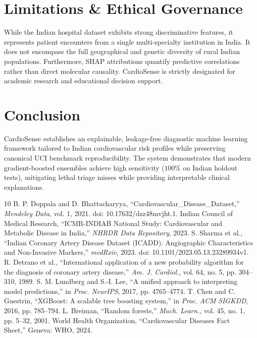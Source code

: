 \documentclass[journal]{IEEEtran}
\begin{document}
\section{Limitations \& Ethical Governance}
While the Indian hospital dataset exhibits strong discriminative features, it represents patient encounters from a single multi-specialty institution in India. It does not encompass the full geographical and genetic diversity of rural Indian populations. Furthermore, SHAP attributions quantify predictive correlations rather than direct molecular causality. CardioSense is strictly designated for academic research and educational decision support.

\section{Conclusion}
CardioSense establishes an explainable, leakage-free diagnostic machine learning framework tailored to Indian cardiovascular risk profiles while preserving canonical UCI benchmark reproducibility. The system demonstrates that modern gradient-boosted ensembles achieve high sensitivity ($100\%$ on Indian holdout tests), mitigating lethal triage misses while providing interpretable clinical explanations.

\begin{thebibliography}{10}
 B. P. Doppala and D. Bhattacharyya, ``Cardiovascular\_Disease\_Dataset,'' \emph{Mendeley Data}, vol. 1, 2021. doi: 10.17632/dzz48mvjht.1.
 Indian Council of Medical Research, ``ICMR-INDIAB National Study: Cardiovascular and Metabolic Disease in India,'' \emph{NHRDR Data Repository}, 2023.
 S. Sharma et al., ``Indian Coronary Artery Disease Dataset (ICADD): Angiographic Characteristics and Non-Invasive Markers,'' \emph{medRxiv}, 2023. doi: 10.1101/2023.05.13.23289934v1.
 R. Detrano et al., ``International application of a new probability algorithm for the diagnosis of coronary artery disease,'' \emph{Am. J. Cardiol.}, vol. 64, no. 5, pp. 304--310, 1989.
 S. M. Lundberg and S.-I. Lee, ``A unified approach to interpreting model predictions,'' in \emph{Proc. NeurIPS}, 2017, pp. 4765--4774.
 T. Chen and C. Guestrin, ``XGBoost: A scalable tree boosting system,'' in \emph{Proc. ACM SIGKDD}, 2016, pp. 785--794.
 L. Breiman, ``Random forests,'' \emph{Mach. Learn.}, vol. 45, no. 1, pp. 5--32, 2001.
 World Health Organization, ``Cardiovascular Diseases Fact Sheet,'' Geneva: WHO, 2024.
\end{thebibliography}
\end{document}
